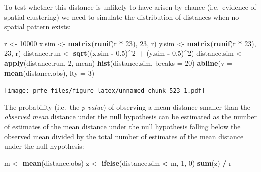 \documentclass[12pt,a4paper]{book}
\newenvironment{Shaded}{\begin{snugshade}}{\end{snugshade}}
\newcommand{\KeywordTok}[1]{\textcolor[rgb]{0.13,0.29,0.53}{\textbf{#1}}}
\newcommand{\DataTypeTok}[1]{\textcolor[rgb]{0.13,0.29,0.53}{#1}}
\newcommand{\DecValTok}[1]{\textcolor[rgb]{0.00,0.00,0.81}{#1}}
\newcommand{\FloatTok}[1]{\textcolor[rgb]{0.00,0.00,0.81}{#1}}
\newcommand{\StringTok}[1]{\textcolor[rgb]{0.31,0.60,0.02}{#1}}
\newcommand{\OperatorTok}[1]{\textcolor[rgb]{0.81,0.36,0.00}{\textbf{#1}}}
\newcommand{\NormalTok}[1]{#1}
\theoremstyle{definition}
\theoremstyle{definition}
\theoremstyle{definition}
\theoremstyle{remark}
\begin{document}
To test whether this distance is unlikely to have arisen by chance
(i.e.~evidence of spatial clustering) we need to simulate the
distribution of distances when no spatial pattern exists:

\begin{Shaded}
\begin{Highlighting}[]
\NormalTok{r <-}\StringTok{ }\DecValTok{10000}
\NormalTok{x.sim <-}\StringTok{ }\KeywordTok{matrix}\NormalTok{(}\KeywordTok{runif}\NormalTok{(r }\OperatorTok{*}\StringTok{ }\DecValTok{23}\NormalTok{), }\DecValTok{23}\NormalTok{, r)}
\NormalTok{y.sim <-}\StringTok{ }\KeywordTok{matrix}\NormalTok{(}\KeywordTok{runif}\NormalTok{(r }\OperatorTok{*}\StringTok{ }\DecValTok{23}\NormalTok{), }\DecValTok{23}\NormalTok{, r)}
\NormalTok{distance.run <-}\StringTok{ }\KeywordTok{sqrt}\NormalTok{((x.sim }\OperatorTok{-}\StringTok{ }\FloatTok{0.5}\NormalTok{)}\OperatorTok{^}\DecValTok{2} \OperatorTok{+}\StringTok{ }\NormalTok{(y.sim }\OperatorTok{-}\StringTok{ }\FloatTok{0.5}\NormalTok{)}\OperatorTok{^}\DecValTok{2}\NormalTok{)}
\NormalTok{distance.sim <-}\StringTok{ }\KeywordTok{apply}\NormalTok{(distance.run, }\DecValTok{2}\NormalTok{, mean)}
\KeywordTok{hist}\NormalTok{(distance.sim, }\DataTypeTok{breaks =} \DecValTok{20}\NormalTok{)}
\KeywordTok{abline}\NormalTok{(}\DataTypeTok{v =} \KeywordTok{mean}\NormalTok{(distance.obs), }\DataTypeTok{lty =} \DecValTok{3}\NormalTok{)}
\end{Highlighting}
\end{Shaded}

\texttt{[image: prfe\_files/figure-latex/unnamed-chunk-523-1.pdf]}

The probability (i.e.~the \emph{p-value}) of observing a mean distance
smaller than the \emph{observed mean} distance under the null hypothesis
can be estimated as the number of estimates of the mean distance under
the null hypothesis falling below the observed mean divided by the total
number of estimates of the mean distance under the null hypothesis:

\begin{Shaded}
\begin{Highlighting}[]
\NormalTok{m <-}\StringTok{ }\KeywordTok{mean}\NormalTok{(distance.obs)}
\NormalTok{z <-}\StringTok{ }\KeywordTok{ifelse}\NormalTok{(distance.sim }\OperatorTok{<}\StringTok{ }\NormalTok{m, }\DecValTok{1}\NormalTok{, }\DecValTok{0}\NormalTok{)}
\KeywordTok{sum}\NormalTok{(z) }\OperatorTok{/}\StringTok{ }\NormalTok{r}
\end{Highlighting}
\end{Shaded}
\end{document}
